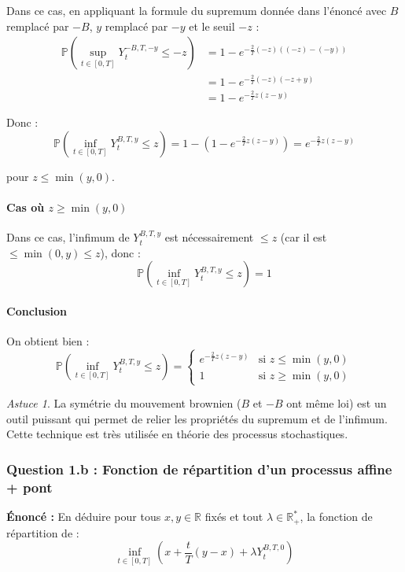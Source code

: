 \documentclass[12pt,a4paper]{article}
\theoremstyle{definition}
\theoremstyle{remark}
\newtheorem*{astuce}{Astuce}
\newcommand{\R}{\mathbb{R}}
\newcommand{\Prob}{\mathbb{P}}
\begin{document}
Dans ce cas, en appliquant la formule du supremum donnée dans l'énoncé avec $B$ remplacé par $-B$, $y$ remplacé par $-y$ et le seuil $-z$ :
\begin{align*}
\Prob\left(\sup_{t \in [0,T]} Y_t^{-B,T,-y} \leq -z\right) &= 1 - e^{-\frac{2}{T}(-z)((-z)-(-y))} \\
&= 1 - e^{-\frac{2}{T}(-z)(-z+y)} \\
&= 1 - e^{-\frac{2}{T}z(z-y)}
\end{align*}

Donc :
\[
\Prob\left(\inf_{t \in [0,T]} Y_t^{B,T,y} \leq z\right) = 1 - (1 - e^{-\frac{2}{T}z(z-y)}) = e^{-\frac{2}{T}z(z-y)}
\]

pour $z \leq \min(y,0)$.

\paragraph{Cas où $z \geq \min(y,0)$}

Dans ce cas, l'infimum de $Y_t^{B,T,y}$ est nécessairement $\leq z$ (car il est $\leq \min(0,y) \leq z$), donc :
\[
\Prob\left(\inf_{t \in [0,T]} Y_t^{B,T,y} \leq z\right) = 1
\]

\paragraph{Conclusion}

On obtient bien :
\[
\boxed{
\Prob\left(\inf_{t \in [0,T]} Y_t^{B,T,y} \leq z\right) = \begin{cases}
e^{-\frac{2}{T}z(z-y)} & \text{si } z \leq \min(y,0) \\
1 & \text{si } z \geq \min(y,0)
\end{cases}
}
\]

\begin{astuce}
La symétrie du mouvement brownien ($B$ et $-B$ ont même loi) est un outil puissant qui permet de relier les propriétés du supremum et de l'infimum. Cette technique est très utilisée en théorie des processus stochastiques.
\end{astuce}

\subsubsection{Question 1.b : Fonction de répartition d'un processus affine + pont}

\textbf{Énoncé :} En déduire pour tous $x, y \in \R$ fixés et tout $\lambda \in \R_+^*$, la fonction de répartition de :
\[
\inf_{t \in [0,T]} \left(x + \frac{t}{T}(y-x) + \lambda Y_t^{B,T,0}\right)
\]
\end{document}
